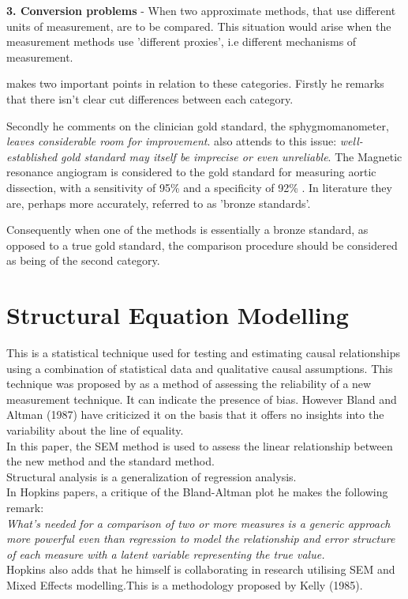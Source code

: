\smallskip
\textbf{3. Conversion problems} -  When two approximate methods,
that use different units of measurement, are to be compared. This
situation would arise when the measurement methods use 'different
proxies', i.e different mechanisms of measurement.

\bigskip
\citet{DunnSEME} makes two important points in relation to these
categories. Firstly he remarks that there isn't clear cut
differences between each category.

Secondly he comments on the clinician gold standard, the
sphygmomanometer, \emph{leaves considerable room for improvement}.
\citet{pizzi} also attends to this issue: \emph{well-established
gold standard may itself be imprecise or even unreliable}.
\bigskip
The Magnetic resonance angiogram is considered to the gold
standard for measuring aortic dissection, with a sensitivity of
95\% and a specificity of 92\% . \citep{ACR}
\bigskip
In literature they are, perhaps more accurately, referred to as
'bronze standards'.
\bigskip

Consequently when one of the methods is essentially a bronze
standard, as opposed to a true gold standard, the comparison
procedure should be considered as being of the second category.

\section{Structural Equation Modelling}
This is a statistical technique used for testing and estimating causal relationships using a combination of statistical data and qualitative causal assumptions. This technique was proposed by \citet{Lewis} as a method of assessing the reliability of a new measurement technique. It can indicate the presence of bias. However Bland and Altman (1987) have criticized it on the basis that it offers no insights into the variability about the line of equality.
\\
In this paper, the SEM method is used to assess the linear relationship between the new method and the standard method.
\\
Structural analysis is a generalization of regression analysis.
\\
In Hopkins papers, a critique of the Bland-Altman plot he makes the following remark:
\\
\emph{What's needed for a comparison of two or more measures is a
generic approach more powerful even than regression to model the
relationship and error structure of each measure with a latent
variable representing the true value.}
\\
Hopkins also adds that he himself is collaborating in research utilising SEM and Mixed Effects modelling.This is a methodology proposed by Kelly (1985).
